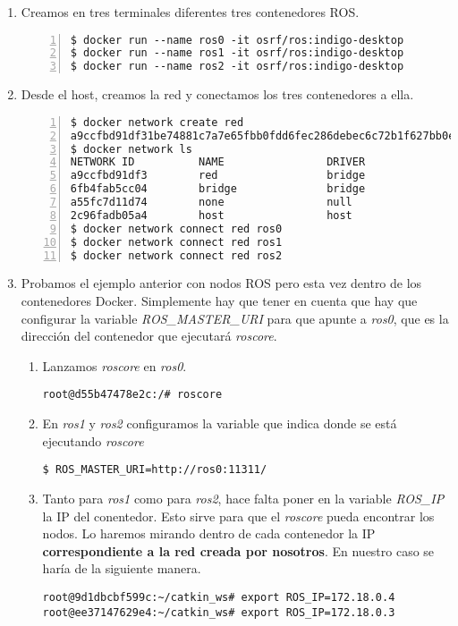 	\begin{enumerate}
		\item Creamos en tres terminales diferentes tres contenedores ROS.
		\begin{lstlisting}[style=consola,numbers=left]
$ docker run --name ros0 -it osrf/ros:indigo-desktop
$ docker run --name ros1 -it osrf/ros:indigo-desktop
$ docker run --name ros2 -it osrf/ros:indigo-desktop
		\end{lstlisting}
		
		\item Desde el host, creamos la red y conectamos los tres contenedores a ella.
		\begin{lstlisting}[style=consola,numbers=left]
$ docker network create red
a9ccfbd91df31be74881c7a7e65fbb0fdd6fec286debec6c72b1f627bb0e2ad0
$ docker network ls
NETWORK ID          NAME                DRIVER
a9ccfbd91df3        red                 bridge              
6fb4fab5cc04        bridge              bridge              
a55fc7d11d74        none                null                
2c96fadb05a4        host                host                
$ docker network connect red ros0
$ docker network connect red ros1
$ docker network connect red ros2
		\end{lstlisting}
		
		\item Probamos el ejemplo anterior con nodos ROS pero esta vez dentro de los contenedores Docker. Simplemente hay que tener en cuenta que hay que configurar la variable \emph{ROS\_MASTER\_URI} para que apunte a \emph{ros0}, que es la dirección del contenedor que ejecutará \emph{roscore}.
		
		\begin{enumerate}
			\item Lanzamos \emph{roscore} en \emph{ros0}.
			\begin{lstlisting}[style=consola]
root@d55b47478e2c:/# roscore
			\end{lstlisting}
			
			\item En \emph{ros1} y \emph{ros2} configuramos la variable que indica donde se está ejecutando \emph{roscore}
			\begin{lstlisting}[style=consola]
$ ROS_MASTER_URI=http://ros0:11311/
			\end{lstlisting}
			
			\item Tanto para \emph{ros1} como para \emph{ros2}, hace falta poner en la variable \emph{ROS\_IP} la IP del conentedor. Esto sirve para que el \emph{roscore} pueda encontrar los nodos. Lo haremos mirando dentro de cada contenedor la IP \textbf{correspondiente a la red creada por nosotros}. En nuestro caso se haría de la siguiente manera.
			\begin{lstlisting}[style=consola]
root@9d1dbcbf599c:~/catkin_ws# export ROS_IP=172.18.0.4
root@ee37147629e4:~/catkin_ws# export ROS_IP=172.18.0.3
			\end{lstlisting}
			

\end{enumerate}
\end{enumerate}
